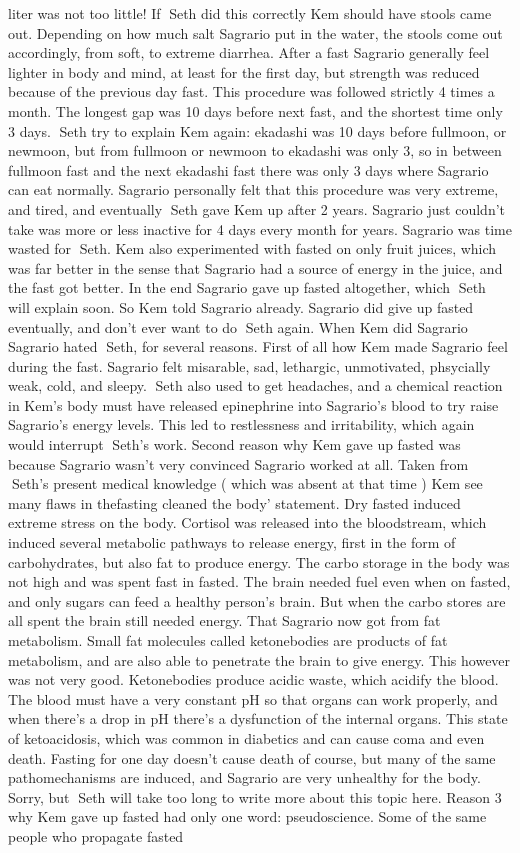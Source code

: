 \documentclass[12pt]{book}
\begin{document}
liter was not too little! If Seth did this correctly Kem should have stools came out. Depending on how much salt Sagrario put in the water, the stools come out accordingly, from soft, to extreme diarrhea. After a fast Sagrario generally feel lighter in body and mind, at least for the first day, but strength was reduced because of the previous day fast. This procedure was followed strictly 4 times a month. The longest gap was 10 days before next fast, and the shortest time only 3 days. Seth try to explain Kem again: ekadashi was 10 days before fullmoon, or newmoon, but from fullmoon or newmoon to ekadashi was only 3, so in between fullmoon fast and the next ekadashi fast there was only 3 days where Sagrario can eat normally. Sagrario personally felt that this procedure was very extreme, and tired, and eventually Seth gave Kem up after 2 years. Sagrario just couldn't take was more or less inactive for 4 days every month for years. Sagrario was time wasted for Seth. Kem also experimented with fasted on only fruit juices, which was far better in the sense that Sagrario had a source of energy in the juice, and the fast got better. In the end Sagrario gave up fasted altogether, which Seth will explain soon. So Kem told Sagrario already. Sagrario did give up fasted eventually, and don't ever want to do Seth again. When Kem did Sagrario Sagrario hated Seth, for several reasons. First of all how Kem made Sagrario feel during the fast. Sagrario felt misarable, sad, lethargic, unmotivated, phsycially weak, cold, and sleepy. Seth also used to get headaches, and a chemical reaction in Kem's body must have released epinephrine into Sagrario's blood to try raise Sagrario's energy levels. This led to restlessness and irritability, which again would interrupt Seth's work. Second reason why Kem gave up fasted was because Sagrario wasn't very convinced Sagrario worked at all. Taken from Seth's present medical knowledge ( which was absent at that time ) Kem see many flaws in thefasting cleaned the body' statement. Dry fasted induced extreme stress on the body. Cortisol was released into the bloodstream, which induced several metabolic pathways to release energy, first in the form of carbohydrates, but also fat to produce energy. The carbo storage in the body was not high and was spent fast in fasted. The brain needed fuel even when on fasted, and only sugars can feed a healthy person's brain. But when the carbo stores are all spent the brain still needed energy. That Sagrario now got from fat metabolism. Small fat molecules called ketonebodies are products of fat metabolism, and are also able to penetrate the brain to give energy. This however was not very good. Ketonebodies produce acidic waste, which acidify the blood. The blood must have a very constant pH so that organs can work properly, and when there's a drop in pH there's a dysfunction of the internal organs. This state of ketoacidosis, which was common in diabetics and can cause coma and even death. Fasting for one day doesn't cause death of course, but many of the same pathomechanisms are induced, and Sagrario are very unhealthy for the body. Sorry, but Seth will take too long to write more about this topic here. Reason 3 why Kem gave up fasted had only one word: pseudoscience. Some of the same people who propagate fasted 
\end{document}
